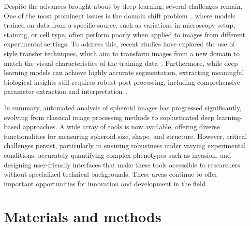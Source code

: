 \documentclass[preprint,12pt]{elsarticle}
\begin{document}
Despite the advances brought about by deep learning, several challenges remain. One of the most prominent issues is the domain shift problem~\cite{2024SpheroidSegDeDeb,2024Dominguez}, where models trained on data from a specific source, such as variations in microscopy setup, staining, or cell type, often perform poorly when applied to images from different experimental settings. To address this, recent studies have explored the use of style transfer techniques, which aim to transform images from a new domain to match the visual characteristics of the training data~\cite{2024Dominguez}. Furthermore, while deep learning models can achieve highly accurate segmentation, extracting meaningful biological insights still requires robust post-processing, including comprehensive parameter extraction and interpretation~\cite{2022Insidia2}.

In summary, automated analysis of spheroid images has progressed significantly, evolving from classical image processing methods to sophisticated deep learning-based approaches. A wide array of tools is now available, offering diverse functionalities for measuring spheroid size, shape, and structure. However, critical challenges persist, particularly in ensuring robustness under varying experimental conditions, accurately quantifying complex phenotypes such as invasion, and designing user-friendly interfaces that make these tools accessible to researchers without specialized technical backgrounds. These areas continue to offer important opportunities for innovation and development in the field.

\section{Materials and methods}
\label{sec:materials}
\end{document}
